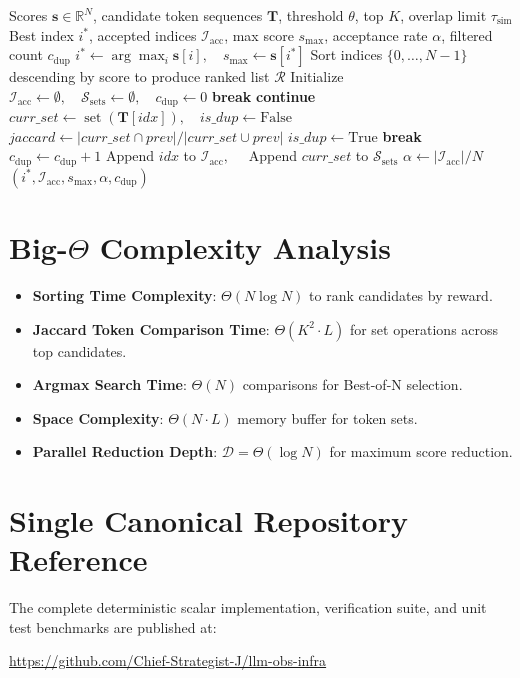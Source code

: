 \documentclass[11pt,a4paper]{article}
\theoremstyle{definition}
\begin{document}
\begin{algorithm}[H]
\caption{Rejection Sampling Best-of-N Selection and Diversity Filter}
\begin{algorithmic}[1]
\Require Scores $\mathbf{s} \in \mathbb{R}^N$, candidate token sequences $\mathbf{T}$, threshold $\theta$, top $K$, overlap limit $\tau_{\text{sim}}$
\Ensure Best index $i^*$, accepted indices $\mathcal{I}_{\text{acc}}$, max score $s_{\max}$, acceptance rate $\alpha$, filtered count $c_{\text{dup}}$
\State $i^* \gets \arg\max_{i} \mathbf{s}[i], \quad s_{\max} \gets \mathbf{s}[i^*]$
\State Sort indices $\{0, \dots, N-1\}$ descending by score to produce ranked list $\mathcal{R}$
\State Initialize $\mathcal{I}_{\text{acc}} \gets \emptyset, \quad \mathcal{S}_{\text{sets}} \gets \emptyset, \quad c_{\text{dup}} \gets 0$
     \State \textbf{break} \EndIf
     \State \textbf{continue} \EndIf
    \State $curr\_set \gets \operatorname{set}(\mathbf{T}[idx]), \quad is\_dup \gets \text{False}$
        \State $jaccard \gets |curr\_set \cap prev| / |curr\_set \cup prev|$
            \State $is\_dup \gets \text{True}$
            \State \textbf{break}
        \EndIf
    \EndFor
        \State $c_{\text{dup}} \gets c_{\text{dup}} + 1$
    \Else
        \State Append $idx$ to $\mathcal{I}_{\text{acc}}, \quad$ Append $curr\_set$ to $\mathcal{S}_{\text{sets}}$
    \EndIf
\EndFor
\State $\alpha \gets |\mathcal{I}_{\text{acc}}| / N$
\State \Return $(i^*, \mathcal{I}_{\text{acc}}, s_{\max}, \alpha, c_{\text{dup}})$
\end{algorithmic}
\end{algorithm}

\section{Big-$\Theta$ Complexity Analysis}

\begin{itemize}
    \item \textbf{Sorting Time Complexity}: $\Theta(N \log N)$ to rank candidates by reward.
    \item \textbf{Jaccard Token Comparison Time}: $\Theta(K^2 \cdot L)$ for set operations across top candidates.
    \item \textbf{Argmax Search Time}: $\Theta(N)$ comparisons for Best-of-N selection.
    \item \textbf{Space Complexity}: $\Theta(N \cdot L)$ memory buffer for token sets.
    \item \textbf{Parallel Reduction Depth}: $\mathcal{D} = \Theta(\log N)$ for maximum score reduction.
\end{itemize}

\section{Single Canonical Repository Reference}

The complete deterministic scalar implementation, verification suite, and unit test benchmarks are published at:
\begin{center}
\url{https://github.com/Chief-Strategist-J/llm-obs-infra}
\end{center}
\end{document}
